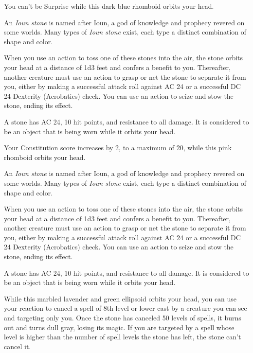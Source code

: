 \documentclass[10pt,a4paper,twoside,bg=print,twocolumn,openany,nodeprecatedcode]{dndbook}
\begin{document}
You can't be Surprise while this dark blue rhomboid orbits your head.

An \textit{Ioun stone} is named after Ioun, a god of knowledge and prophecy revered on some worlds. Many types of \textit{Ioun stone} exist, each type a distinct combination of shape and color.

When you use an action to toss one of these stones into the air, the stone orbits your head at a distance of 1d3 feet and confers a benefit to you. Thereafter, another creature must use an action to grasp or net the stone to separate it from you, either by making a successful attack roll against AC 24 or a successful DC 24 Dexterity (Acrobatics) check. You can use an action to seize and stow the stone, ending its effect.

A stone has AC 24, 10 hit points, and resistance to all damage. It is considered to be an object that is being worn while it orbits your head.

Your Constitution score increases by 2, to a maximum of 20, while this pink rhomboid orbits your head.

An \textit{Ioun stone} is named after Ioun, a god of knowledge and prophecy revered on some worlds. Many types of \textit{Ioun stone} exist, each type a distinct combination of shape and color.

When you use an action to toss one of these stones into the air, the stone orbits your head at a distance of 1d3 feet and confers a benefit to you. Thereafter, another creature must use an action to grasp or net the stone to separate it from you, either by making a successful attack roll against AC 24 or a successful DC 24 Dexterity (Acrobatics) check. You can use an action to seize and stow the stone, ending its effect.

A stone has AC 24, 10 hit points, and resistance to all damage. It is considered to be an object that is being worn while it orbits your head.

While this marbled lavender and green ellipsoid orbits your head, you can use your reaction to cancel a spell of 8th level or lower cast by a creature you can see and targeting only you. Once the stone has canceled 50 levels of spells, it burns out and turns dull gray, losing its magic. If you are targeted by a spell whose level is higher than the number of spell levels the stone has left, the stone can't cancel it.
\end{document}
